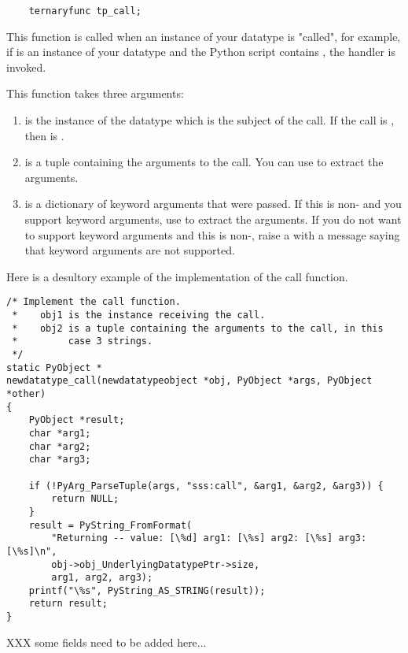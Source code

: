 \begin{verbatim}
    ternaryfunc tp_call;
\end{verbatim}

This function is called when an instance of your datatype is "called",
for example, if  is an instance of your datatype and the Python
script contains , the  handler is
invoked.

This function takes three arguments:

\begin{enumerate}
  \item
     is the instance of the datatype which is the subject of
    the call. If the call is , then  is
    .

  \item
     is a tuple containing the arguments to the call.  You
    can use  to extract the arguments.

  \item
     is a dictionary of keyword arguments that were passed.
    If this is non-\NULL{} and you support keyword arguments, use
     to extract the
    arguments.  If you do not want to support keyword arguments and
    this is non-\NULL, raise a  with a message
    saying that keyword arguments are not supported.
\end{enumerate}
       
Here is a desultory example of the implementation of the call function.

\begin{verbatim}
/* Implement the call function.
 *    obj1 is the instance receiving the call.
 *    obj2 is a tuple containing the arguments to the call, in this
 *         case 3 strings.
 */
static PyObject *
newdatatype_call(newdatatypeobject *obj, PyObject *args, PyObject *other)
{
    PyObject *result;
    char *arg1;
    char *arg2;
    char *arg3;

    if (!PyArg_ParseTuple(args, "sss:call", &arg1, &arg2, &arg3)) {
        return NULL;
    }
    result = PyString_FromFormat(
        "Returning -- value: [\%d] arg1: [\%s] arg2: [\%s] arg3: [\%s]\n",
        obj->obj_UnderlyingDatatypePtr->size,
        arg1, arg2, arg3);
    printf("\%s", PyString_AS_STRING(result));
    return result;
}
\end{verbatim}

XXX some fields need to be added here...


